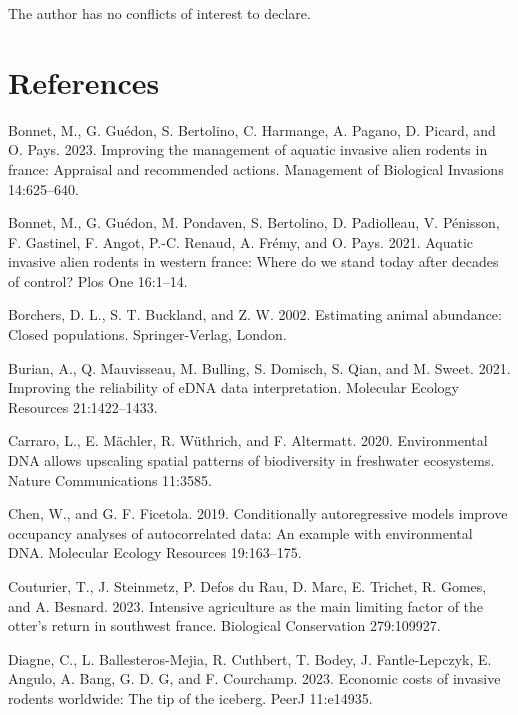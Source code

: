 \documentclass[
  11pt,
  a4paper,
]{article}
\newlength{\cslhangindent}
\newenvironment{CSLReferences}[2] %
 {\begin{list}{}{%
  \setlength{\itemindent}{0pt}
  \setlength{\leftmargin}{0pt}
  \setlength{\parsep}{0pt}
  \ifodd #1
   \setlength{\leftmargin}{\cslhangindent}
   \setlength{\itemindent}{-1\cslhangindent}
  \fi
  \setlength{\itemsep}{#2\baselineskip}}}
 {\end{list}}
\begin{document}
The author has no conflicts of interest to declare.

\section{References}\label{references}

\label{refs}
\begin{CSLReferences}{1}{0}
Bonnet, M., G. Guédon, S. Bertolino, C. Harmange, A. Pagano, D. Picard, and O. Pays. 2023. Improving the management of aquatic invasive alien rodents in france: Appraisal and recommended actions. Management of Biological Invasions 14:625--640.

Bonnet, M., G. Guédon, M. Pondaven, S. Bertolino, D. Padiolleau, V. Pénisson, F. Gastinel, F. Angot, P.-C. Renaud, A. Frémy, and O. Pays. 2021. Aquatic invasive alien rodents in western france: Where do we stand today after decades of control? Plos One 16:1--14.

Borchers, D. L., S. T. Buckland, and Z. W. 2002. Estimating animal abundance: Closed populations. Springer-Verlag, London.

Burian, A., Q. Mauvisseau, M. Bulling, S. Domisch, S. Qian, and M. Sweet. 2021. Improving the reliability of eDNA data interpretation. Molecular Ecology Resources 21:1422--1433.

Carraro, L., E. Mächler, R. Wüthrich, and F. Altermatt. 2020. Environmental DNA allows upscaling spatial patterns of biodiversity in freshwater ecosystems. Nature Communications 11:3585.

Chen, W., and G. F. Ficetola. 2019. Conditionally autoregressive models improve occupancy analyses of autocorrelated data: An example with environmental DNA. Molecular Ecology Resources 19:163--175.

Couturier, T., J. Steinmetz, P. Defos du Rau, D. Marc, E. Trichet, R. Gomes, and A. Besnard. 2023. Intensive agriculture as the main limiting factor of the otter's return in southwest france. Biological Conservation 279:109927.

Diagne, C., L. Ballesteros-Mejia, R. Cuthbert, T. Bodey, J. Fantle-Lepczyk, E. Angulo, A. Bang, G. D. G, and F. Courchamp. 2023. Economic costs of invasive rodents worldwide: The tip of the iceberg. PeerJ 11:e14935.


\end{CSLReferences}
\end{document}

